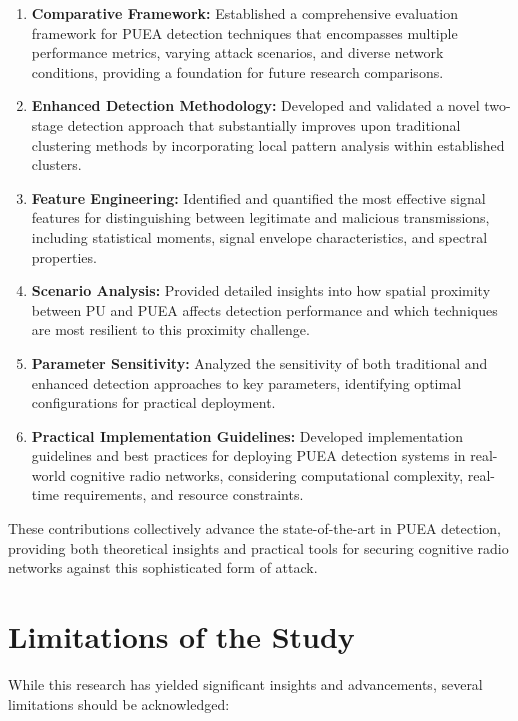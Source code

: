 \begin{enumerate}
    \item \textbf{Comparative Framework:} Established a comprehensive evaluation framework for PUEA detection techniques that encompasses multiple performance metrics, varying attack scenarios, and diverse network conditions, providing a foundation for future research comparisons.

    \item \textbf{Enhanced Detection Methodology:} Developed and validated a novel two-stage detection approach that substantially improves upon traditional clustering methods by incorporating local pattern analysis within established clusters.

    \item \textbf{Feature Engineering:} Identified and quantified the most effective signal features for distinguishing between legitimate and malicious transmissions, including statistical moments, signal envelope characteristics, and spectral properties.

    \item \textbf{Scenario Analysis:} Provided detailed insights into how spatial proximity between PU and PUEA affects detection performance and which techniques are most resilient to this proximity challenge.

    \item \textbf{Parameter Sensitivity:} Analyzed the sensitivity of both traditional and enhanced detection approaches to key parameters, identifying optimal configurations for practical deployment.
    
    \item \textbf{Practical Implementation Guidelines:} Developed implementation guidelines and best practices for deploying PUEA detection systems in real-world cognitive radio networks, considering computational complexity, real-time requirements, and resource constraints.
\end{enumerate}

These contributions collectively advance the state-of-the-art in PUEA detection, providing both theoretical insights and practical tools for securing cognitive radio networks against this sophisticated form of attack.

\section{Limitations of the Study}

While this research has yielded significant insights and advancements, several limitations should be acknowledged:

